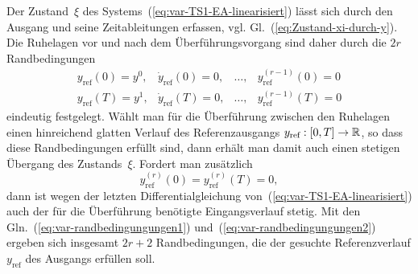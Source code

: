 Der Zustand~$\xi$ des Systems~(\ref{eq:var-TS1-EA-linearisiert})
lässt sich durch den Ausgang und seine Zeitableitungen erfassen, vgl.
Gl.~(\ref{eq:Zustand-xi-durch-y}). Die Ruhelagen vor und nach dem
Überführungsvorgang sind daher durch die $2r$ Randbedingungen
\begin{equation}
\begin{array}{llll}
y_{\text{ref}}(0)=y^{0}, & \dot{y}_{\text{ref}}(0)=0, & \ldots, & y_{\text{ref}}^{(r-1)}(0)=0\\
y_{\text{ref}}(T)=y^{1}, & \dot{y}_{\text{ref}}(T)=0, & \ldots, & y_{\text{ref}}^{(r-1)}(T)=0
\end{array}\label{eq:var-randbedingungungen1}
\end{equation}
eindeutig festgelegt. Wählt man für die Überführung zwischen den Ruhelagen
einen hinreichend glatten Verlauf des Referenzausgangs $y_{\text{ref}}:[0,T]\to{\mathbb{R}}$,
so dass diese Randbedingungen erfüllt sind, dann erhält man damit
auch einen stetigen Übergang des Zustands~$\xi$. Fordert man zusätzlich
\begin{equation}
y_{\text{ref}}^{(r)}(0)=y_{\text{ref}}^{(r)}(T)=0,\label{eq:var-randbedingungungen2}
\end{equation}
dann ist wegen der letzten Differentialgleichung von~(\ref{eq:var-TS1-EA-linearisiert})
auch der für die Überführung benötigte Eingangsverlauf stetig. Mit
den Gln.~(\ref{eq:var-randbedingungungen1}) und~(\ref{eq:var-randbedingungungen2})
ergeben sich insgesamt $2r+2$ Randbedingungen, die der gesuchte Referenzverlauf
$y_{\text{ref}}$ des Ausgangs erfüllen soll.

